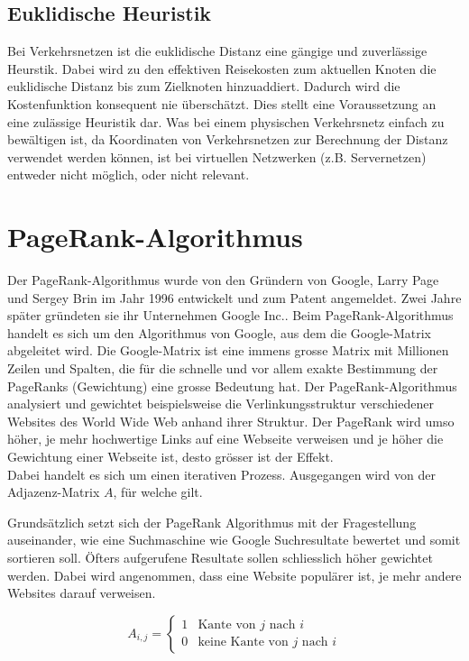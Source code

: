 \subsection{Euklidische Heuristik}
Bei Verkehrsnetzen ist die euklidische Distanz eine gängige und zuverlässige Heurstik. Dabei wird zu den effektiven Reisekosten zum aktuellen Knoten die euklidische Distanz bis zum Zielknoten hinzuaddiert. Dadurch wird die Kostenfunktion konsequent nie überschätzt. Dies stellt eine Voraussetzung an eine zulässige Heuristik dar.
Was bei einem physischen Verkehrsnetz einfach zu bewältigen ist, da Koordinaten von Verkehrsnetzen zur Berechnung der Distanz verwendet werden können, ist bei virtuellen Netzwerken (z.B. Servernetzen) entweder nicht möglich, oder nicht relevant.

\section{PageRank-Algorithmus}
Der PageRank-Algorithmus wurde von den Gründern von Google, Larry Page und Sergey Brin im Jahr 1996 entwickelt und zum Patent angemeldet. Zwei Jahre später gründeten sie ihr Unternehmen Google Inc..
Beim PageRank-Algorithmus handelt es sich um den Algorithmus von Google, aus dem die Google-Matrix abgeleitet wird.
Die Google-Matrix ist eine immens grosse Matrix mit Millionen Zeilen und Spalten, die für die schnelle und vor allem exakte Bestimmung der PageRanks (Gewichtung) eine grosse Bedeutung hat.
Der PageRank-Algorithmus analysiert und gewichtet beispielsweise die Verlinkungsstruktur verschiedener Websites des World Wide Web anhand ihrer Struktur.
Der PageRank wird umso höher, je mehr hochwertige Links auf eine Webseite verweisen und je höher die Gewichtung einer Webseite ist, desto grösser ist der Effekt.\\
Dabei handelt es sich um einen iterativen Prozess. Ausgegangen wird von der Adjazenz-Matrix $A$, für welche gilt.

Grundsätzlich setzt sich der PageRank Algorithmus mit der Fragestellung auseinander, wie eine Suchmaschine wie Google Suchresultate bewertet und somit sortieren soll. Öfters aufgerufene Resultate sollen schliesslich höher gewichtet werden. Dabei wird angenommen, dass eine Website populärer ist, je mehr andere Websites darauf verweisen.

\begin{equation}
A_{i,j}=\left\{ \begin{matrix}
1 & \text{Kante von $j$ nach $i$} \\ 0 & \text{keine Kante von $j$ nach $i$}
\end{matrix}
 \right.
\label{verkehr:Adja}
\end{equation}


